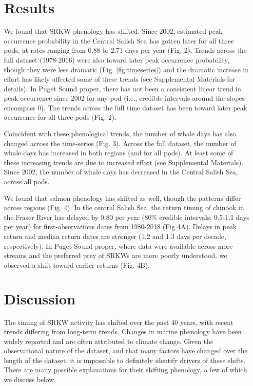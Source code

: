 \documentclass{article}
\begin{document}
\section*{Results}
\par We found that SRKW phenology has shifted. Since 2002, estimated peak occurrence probability in the Central Salish Sea has gotten later for all three pods, at rates ranging from 0.88  to 2.71 days per year (Fig. 2). Trends across the full dataset (1978-2016) were also toward later peak occurrence probability, though they were less dramatic (Fig. \ref{fig:timeseries}) and the dramatic increase in effort has likely affected some of these trends (see Supplemental Materials for details).  In Puget Sound proper, there has not been a consistent linear trend in peak occurrence since 2002 for any pod (i.e., credible intervals around the slopes encompass 0). The trends across the full time dataset has been toward later peak occurrence for all three pods (Fig. 2). 
\par Coincident with these phenological trends, the number of whale days has also changed across the time-series (Fig. 3). Across the full dataset, the number of whale days has increased in both regions (and for all pods). At least some of these increasing trends are due to increased effort (see Supplemental Materials). Since 2002, the number of whale days has decreased in the Central Salish Sea, across all pods. 
\par We found that salmon phenology has shifted as well, though the patterns differ across regions (Fig. 4). In the central Salish Sea, the return timing of chinook in the Fraser River has delayed by 0.80 per year (80\% credible intervals: 0.5-1.1 days per year) for first-observations dates from 1980-2018 (Fig 4A).  Delays in peak return and median return dates are stronger (1.2 and 1.3 days per decade, respectively). In Puget Sound proper, where data were available across more streams and the preferred prey of SRKWs are more poorly understood, we observed a shift toward earlier returns (Fig. 4B).
\par
\section*{Discussion}
\par The timing of SRKW activity has shifted over the past 40 years, with recent trends differing from long-term trends. Changes in marine phenology have been widely reparted and are often attributed to climate change. Given the observational nature of the dataset, and that many factors have changed over the length of the dataset, it is impossible to definitely identify drivers of these shifts. There are many possible explanations for their shifting phenology, a few of which we discuss below.
\end{document}
